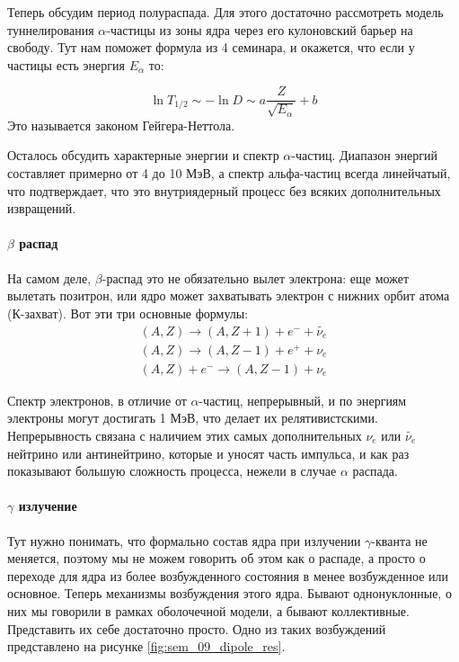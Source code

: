 \documentclass[12pt]{article}
\begin{document}
\vspace{1em} \noindent
Теперь обсудим период полураспада. Для этого достаточно рассмотреть модель туннелирования $\alpha$-частицы из зоны ядра через его кулоновский барьер на свободу. Тут нам поможет формула из 4 семинара, и окажется, что если у частицы есть энергия $E_{\alpha}$ то:

\begin{equation}
    \ln{T_{1/2}} \sim -\ln{D} \sim a \dfrac{Z}{\sqrt{E_{\alpha}}} + b
\end{equation}
Это называется законом Гейгера-Неттола. 

\vspace{1em} \noindent
Осталось обсудить характерные энергии и спектр $\alpha$-частиц. Диапазон энергий составляет примерно от 4 до 10 МэВ, а спектр альфа-частиц всегда линейчатый, что подтверждает, что это внутриядерный процесс без всяких дополнительных извращений.

\paragraph{$\beta$ распад}
На самом деле, $\beta$-распад это не обязательно вылет электрона: еще может вылетать позитрон, или ядро может захватывать электрон с нижних орбит атома (К-захват). Вот эти три основные формулы:
\begin{gather*}
    (A,Z) \rightarrow (A, Z+1) + e^- + \widetilde{\nu_e}\\
    (A,Z) \rightarrow (A, Z-1) + e^+ + \nu_e\\
    (A,Z) +e^- \rightarrow (A, Z-1) + \nu_e
\end{gather*}

\noindent
Спектр электронов, в отличие от $\alpha$-частиц, непрерывный, и по энергиям электроны могут достигать 1 МэВ, что делает их релятивистскими. Непрерывность связана с наличием этих самых дополнительных $\nu_e$ или $\widetilde{\nu_e}$ нейтрино или антинейтрино, которые и уносят часть импульса, и как раз показывают большую сложность процесса, нежели в случае $\alpha$ распада.

\paragraph{$\gamma$ излучение}
Тут нужно понимать, что формально состав ядра при излучении $\gamma$-кванта не меняется, поэтому мы не можем говорить об этом как о распаде, а просто о переходе для ядра из более возбужденного состояния в менее возбужденное или основное. Теперь механизмы возбуждения этого ядра. Бывают однонуклонные, о них мы говорили в рамках оболочечной модели, а бывают коллективные. Представить их себе достаточно просто. Одно из таких возбуждений представлено на рисунке \ref{fig:sem_09_dipole_res}.
\end{document}
